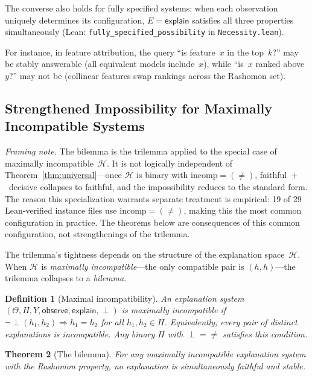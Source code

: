 \documentclass[11pt,a4paper]{article}
\newtheorem{theorem}{Theorem}[section]
\newtheorem{definition}[theorem]{Definition}
\newcommand{\sH}{\mathcal{H}}
\newcommand{\incomp}{\perp}
\begin{document}
The converse also holds for fully specified systems: when each observation
uniquely determines its configuration, $E = \mathsf{explain}$ satisfies all
three properties simultaneously (Lean: \texttt{fully\_specified\_possibility}
in \texttt{Necessity.lean}).



For instance, in feature attribution, the query ``is feature~$x$ in the top~$k$?'' may be stably answerable (all equivalent models include~$x$), while ``is~$x$ ranked above~$y$?'' may not be (collinear features swap rankings across the Rashomon set).

\subsection{Strengthened Impossibility for Maximally Incompatible Systems}
\label{sec:bilemma}

\emph{Framing note.}  The bilemma is the trilemma applied to the special
case of maximally incompatible~$\sH$.  It is not logically independent
of Theorem~\ref{thm:universal}---once $\sH$ is binary with
$\mathrm{incomp} = (\neq)$, faithful~$+$~decisive collapses to faithful,
and the impossibility reduces to the standard form.  The reason this
specialization warrants separate treatment is empirical: 19 of 29
Lean-verified instance files use $\mathrm{incomp} = (\neq)$, making this
the most common configuration in practice.  The theorems below are
consequences of this common configuration, not strengthenings of the
trilemma.

\medskip

The trilemma's tightness depends on the structure of the explanation
space~$\sH$.  When $\sH$ is \emph{maximally incompatible}---the only
compatible pair is $(h, h)$---the trilemma collapses to a \emph{bilemma}.

\begin{definition}[Maximal incompatibility]
\label{def:max-incompat}
An explanation system $(\Theta, H, Y, \mathsf{observe}, \mathsf{explain}, \incomp)$
is \emph{maximally incompatible} if
$\lnot\incomp(h_1, h_2) \Rightarrow h_1 = h_2$
for all $h_1, h_2 \in H$.
Equivalently, every pair of distinct explanations is incompatible.
Any binary $H$ with $\incomp = {\neq}$ satisfies this condition.
\end{definition}

\begin{theorem}[The bilemma]
\label{thm:bilemma}
For any maximally incompatible explanation system with the Rashomon
property, no explanation is simultaneously faithful and stable.
\end{theorem}
\end{document}
